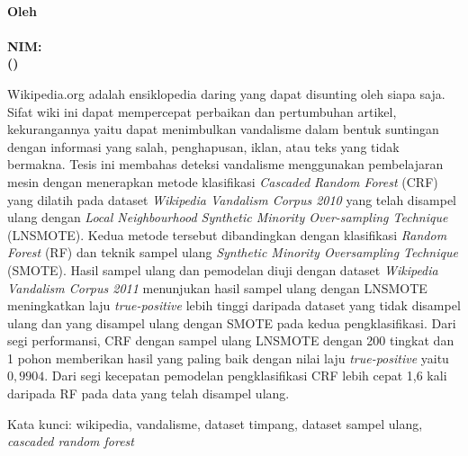 \begin{center}
\textbf{\large
	\MakeUppercase{\judul{}} \\
	\bigskip
	\textnormal{Oleh} \\
	\myname{} \\
	NIM: \mysid{} \\
	(\mydept{}) \\
}
\end{center}

\bigskip
\bigskip
\bigskip

Wikipedia.org adalah ensiklopedia daring yang dapat disunting oleh siapa saja.
Sifat wiki ini dapat mempercepat perbaikan dan pertumbuhan artikel,
kekurangannya yaitu dapat menimbulkan vandalisme dalam bentuk suntingan dengan
informasi yang salah, penghapusan, iklan, atau teks yang tidak bermakna.
Tesis ini membahas deteksi vandalisme menggunakan pembelajaran mesin
dengan menerapkan metode klasifikasi
\textit{Cascaded Random Forest} (CRF)
yang dilatih pada dataset
\textit{Wikipedia Vandalism Corpus 2010}
yang telah disampel ulang dengan
\textit{Local Neighbourhood Synthetic Minority Over-sampling Technique}
(LNSMOTE).
Kedua metode tersebut dibandingkan dengan klasifikasi
\textit{Random Forest} (RF)
dan teknik sampel ulang
\textit{Synthetic Minority Oversampling Technique} (SMOTE).
Hasil sampel ulang dan pemodelan diuji dengan dataset
\textit{Wikipedia Vandalism Corpus 2011}
menunjukan hasil sampel ulang dengan LNSMOTE meningkatkan laju
\textit{true-positive} lebih tinggi daripada dataset yang tidak disampel ulang
dan yang disampel ulang dengan SMOTE pada kedua pengklasifikasi.
Dari segi performansi, CRF dengan sampel ulang LNSMOTE dengan 200 tingkat dan 1
pohon memberikan hasil yang paling baik dengan nilai laju
\textit{true-positive} yaitu $0,9904$.
Dari segi kecepatan pemodelan pengklasifikasi CRF lebih cepat 1,6 kali daripada
RF pada data yang telah disampel ulang.

Kata kunci: wikipedia, vandalisme, dataset timpang, dataset sampel ulang,
\textit{cascaded random forest}

